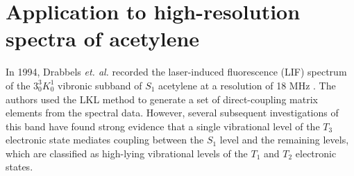 \documentclass[12pt]{mitthesis}
\begin{document}







\section{Application to high-resolution spectra of acetylene}

In 1994, Drabbels \emph{et. al.} recorded the laser-induced
fluorescence (LIF) spectrum of the $3^3_0K^1_0$ vibronic subband of
$S_1$ acetylene at a resolution of 18 MHz \cite{drabbels94}.  The
authors used the LKL method to generate a set of direct-coupling
matrix elements from the spectral data.  However, several subsequent
investigations of this band have found strong evidence that a
single vibrational level of the $T_3$ electronic state mediates coupling
between the $S_1$ level and the remaining levels, which are classified
as high-lying vibrational levels of the $T_1$ and $T_2$ electronic
states.
\end{document}
